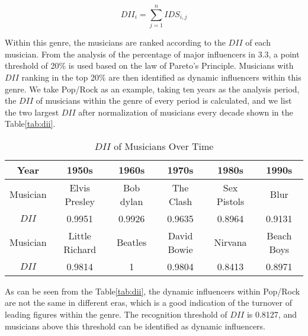 \documentclass[12pt]{article}  %
\newenvironment{shrinkeq}[1]
{ \bgroup
	\addtolength\abovedisplayshortskip{#1}
	\addtolength\abovedisplayskip{#1}
	\addtolength\belowdisplayshortskip{#1}
	\addtolength\belowdisplayskip{#1}}
{\egroup\ignorespacesafterend}
\begin{document}
\begin{shrinkeq}{-1.5ex}
	\begin{equation}
		DII_i=\sum\limits_{j=1}^{n} IDS_{i,j}
	\end{equation}
\end{shrinkeq}

Within this genre, the musicians are ranked according to the $DII$ of each musician. From the analysis of the percentage of major influencers in 3.3, a point threshold of 20\% is used based on the law of Pareto's Principle\cite{4}. Musicians with $DII$ ranking in the top 20\% are then identified as dynamic influencers within this genre. We take Pop/Rock as an example, taking ten years as the analysis period, the $DII$ of musicians within the genre of every period is calculated, and we list the two largest $DII$ after normalization of musicians every decade shown in the Table\eqref{tab:dii}.

\begin{table}[htbp]
	\centering
	\caption{$DII$ of Musicians Over Time}
	\begin{tabular}{c||c|c|c|c|c}
		\hline
		\hline
		Year                 & 1950s                & 1960s                & 1970s                & 1980s                & 1990s                 \\
		\hline
		\hline
		Musician             & Elvis Presley        & Bob dylan            & The Clash            & Sex Pistols          & Blur                  \\
		\hline
		$DII$                  & 0.9951               & 0.9926               & 0.9635               & 0.8964               & 0.9131                \\
		\hline
		Musician             & Little Richard       & Beatles              & David Bowie          &Nirvana             & Beach Boys        \\
		\hline
		$DII$                  & 0.9814               & 1                    & 0.9804               & 0.8413               & 0.8971                \\
		\hline
		\hline
	\end{tabular}%
	\label{tab:dii}%
\end{table}%

As can be seen from the Table\eqref{tab:dii}, the dynamic influencers within Pop/Rock are not the same in different eras, which is a good indication of the turnover of leading figures within the genre. The recognition threshold of $DII$ is 0.8127, and musicians above this threshold can be identified as dynamic influencers.
\vspace{-0.5cm}
\end{document}
